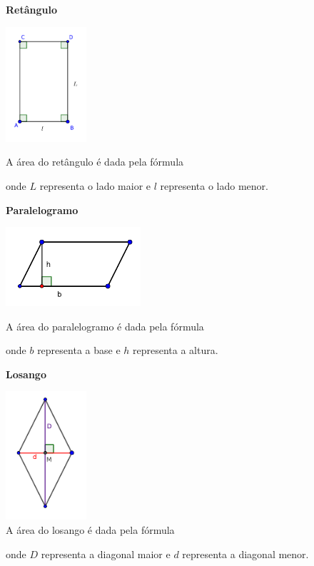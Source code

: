 \textbf{Retângulo}
\begin{multicols}{2}
\includegraphics[width=3cm]{./cap_geometria/figs/retangulo_L}

A área do retângulo é dada pela fórmula


onde $L$ representa o lado maior e $l$ representa o lado menor.
\end{multicols}

\textbf{Paralelogramo}
\begin{multicols}{2}
\includegraphics[width=5cm]{./cap_geometria/figs/paralelogramoL}

A área do paralelogramo é dada pela fórmula


onde $b$ representa a base e $h$ representa a altura.
\end{multicols}



\textbf{Losango}
\begin{multicols}{2}
\includegraphics[width=3cm]{./cap_geometria/figs/losangoL} \\
A área do losango é dada pela fórmula


onde $D$ representa a diagonal maior e $d$ representa a diagonal menor.
\end{multicols}

